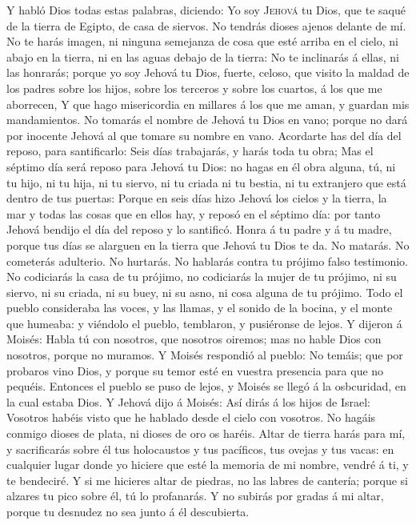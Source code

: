  Y habló Dios todas estas palabras, diciendo:
 Yo soy \textsc{Jehová} tu Dios, que te saqué de la tierra
de Egipto, de casa de siervos.  No tendrás dioses ajenos
delante de mí.  No te harás imagen, ni ninguna semejanza
de cosa que esté arriba en el cielo, ni abajo en la tierra, ni en las
aguas debajo de la tierra:  No te inclinarás á ellas, ni
las honrarás; porque yo soy Jehová tu Dios, fuerte, celoso, que visito
la maldad de los padres sobre los hijos, sobre los terceros y sobre los
cuartos, á los que me aborrecen,  Y que hago misericordia
en millares á los que me aman, y guardan mis mandamientos.
 No tomarás el nombre de Jehová tu Dios en vano; porque no
dará por inocente Jehová al que tomare su nombre en vano. 
Acordarte has del día del reposo, para santificarlo:  Seis
días trabajarás, y harás toda tu obra;  Mas el séptimo
día será reposo para Jehová tu Dios: no hagas en él obra alguna, tú, ni
tu hijo, ni tu hija, ni tu siervo, ni tu criada ni tu bestia, ni tu
extranjero que está dentro de tus puertas:  Porque en
seis días hizo Jehová los cielos y la tierra, la mar y todas las cosas
que en ellos hay, y reposó en el séptimo día: por tanto Jehová bendijo
el día del reposo y lo santificó.  Honra á tu padre y á
tu madre, porque tus días se alarguen en la tierra que Jehová tu Dios te
da.  No matarás.  No cometerás adulterio.
 No hurtarás.  No hablarás contra tu
prójimo falso testimonio.  No codiciarás la casa de tu
prójimo, no codiciarás la mujer de tu prójimo, ni su siervo, ni su
criada, ni su buey, ni su asno, ni cosa alguna de tu prójimo.
 Todo el pueblo consideraba las voces, y las llamas, y el
sonido de la bocina, y el monte que humeaba: y viéndolo el pueblo,
temblaron, y pusiéronse de lejos.  Y dijeron á Moisés:
Habla tú con nosotros, que nosotros oiremos; mas no hable Dios con
nosotros, porque no muramos.  Y Moisés respondió al
pueblo: No temáis; que por probaros vino Dios, y porque su temor esté en
vuestra presencia para que no pequéis.  Entonces el
pueblo se puso de lejos, y Moisés se llegó á la osbcuridad, en la cual
estaba Dios.  Y Jehová dijo á Moisés: Así dirás á los
hijos de Israel: Vosotros habéis visto que he hablado desde el cielo con
vosotros.  No hagáis conmigo dioses de plata, ni dioses
de oro os haréis.  Altar de tierra harás para mí, y
sacrificarás sobre él tus holocaustos y tus pacíficos, tus ovejas y tus
vacas: en cualquier lugar donde yo hiciere que esté la memoria de mi
nombre, vendré á ti, y te bendeciré.  Y si me hicieres
altar de piedras, no las labres de cantería; porque si alzares tu pico
sobre él, tú lo profanarás.  Y no subirás por gradas á mi
altar, porque tu desnudez no sea junto á él descubierta.

